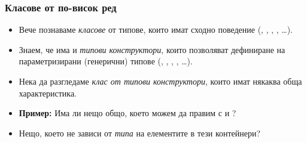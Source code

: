 \documentclass[alsotrans]{beamerswitch}
\begin{document}
\begin{frame}[fragile]
  \frametitle{Класове от по-висок ред}

  \begin{itemize}[<+->]
  \item Вече познаваме \emph{класове} от типове, които имат
    сходно поведение (, , , , \ldots).
  \item
    Знаем, че има и \emph{типови конструктори}, които позволяват дефиниране на параметризирани (генерични) типове (\lst{[]}, , , , \ldots).
  \item
    Нека да разгледаме \emph{клас от типови конструктори}, които имат някаква обща характеристика.
  \item
    \textbf{Пример:} Има ли нещо общо, което можем да правим с \lst{[]} и ?
  \item Нещо, което не зависи от \emph{типа} на елементите в тези контейнери?
  \end{itemize}
\end{frame}
\end{document}
